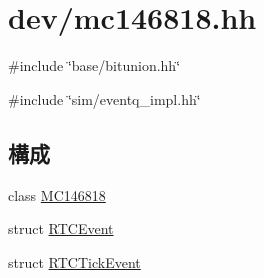 \hypertarget{mc146818_8hh}{
\section{dev/mc146818.hh}
\label{mc146818_8hh}
}
{\ttfamily \#include \char`\"{}base/bitunion.hh\char`\"{}}\par
{\ttfamily \#include \char`\"{}sim/eventq\_\-impl.hh\char`\"{}}\par
\subsection*{構成}
\begin{DoxyCompactItemize}
\item 
class \hyperlink{classMC146818}{MC146818}
\item 
struct \hyperlink{structMC146818_1_1RTCEvent}{RTCEvent}
\item 
struct \hyperlink{structMC146818_1_1RTCTickEvent}{RTCTickEvent}
\end{DoxyCompactItemize}
